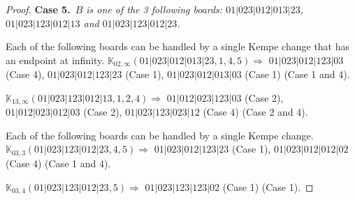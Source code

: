 \documentclass[12pt]{article}
\newcommand{\K}{\mathbb{K}}
\newcommand{\case}[2]{{\bf Case #1.}~{\it #2}~~}
\begin{document}
\begin{proof}
\bigskip


\bigskip
\case{5}{$B$ is one of the 3 following boards:
 $01|023|012|013|23$, $01|023|123|012|13$ and $01|023|123|012|23$.}

\bigskip

Each of the following boards can be handled by a single Kempe change that has an endpoint at infinity.
$\K_{02,\infty}(01|023|012|013|23,1, 4, 5)\Rightarrow $ $01|023|012|123|03$ (Case 4), $01|023|012|123|23$ (Case 1), $01|023|012|013|03$ (Case 1) (Case 1 and 4).

\bigskip

$\K_{13,\infty}(01|023|123|012|13,1, 2, 4)\Rightarrow $ $01|012|023|123|03$ (Case 2), $01|012|023|012|03$ (Case 2), $01|023|123|023|12$ (Case 4) (Case 2 and 4).

\bigskip

\bigskip

Each of the following boards can be handled by a single Kempe change.
$\K_{03,3}(01|023|123|012|23,4, 5)\Rightarrow $ $01|023|012|123|23$ (Case 1), $01|023|012|012|02$ (Case 4) (Case 1 and 4).

$\K_{03,4}(01|023|123|012|23,5)\Rightarrow $ $01|023|123|123|02$ (Case 1) (Case 1).


\bigskip

\end{proof}
\end{document}
